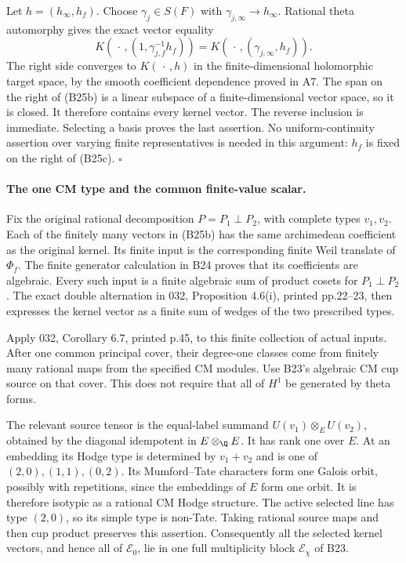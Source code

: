 Let $h=(h_\infty,h_f)$.  Choose
$\gamma_j\in S(F)$ with
$\gamma_{j,\infty}\to h_\infty$.  Rational theta
automorphy gives the exact vector equality
\[
 K(\,\cdot\,,(1,\gamma_{j,f}^{-1}h_f))
       =K(\,\cdot\,,(\gamma_{j,\infty},h_f)).
 \tag{B25c}
\]
The right side converges to $K(\,\cdot\,,h)$ in
the finite-dimensional holomorphic target space,
by the smooth coefficient dependence proved in A7.
The span on the right of (B25b) is a linear
subspace of a finite-dimensional vector space,
so it is closed.  It therefore contains every
kernel vector.  The reverse inclusion is immediate.
Selecting a basis proves the last assertion.
No uniform-continuity assertion over varying finite
representatives is needed in this argument: $h_f$
is fixed on the right of (B25c). \hfill$\square$

\paragraph{The one CM type and the common finite-value scalar.}
Fix the original rational decomposition
$P=P_1\perp P_2$, with complete types $v_1,v_2$.
Each of the finitely many vectors in (B25b) has the
same archimedean coefficient as the original kernel.
Its finite input is the corresponding finite Weil
translate of $\Phi_f$.  The finite generator
calculation in B24 proves that its coefficients
are algebraic.  Every such input is a finite
algebraic sum of product cosets for $P_1\perp P_2$.
The exact double alternation in 032,
Proposition 4.6(i), printed pp.22--23,
then expresses the kernel vector as a finite sum
of wedges of the two prescribed types.

Apply 032, Corollary 6.7, printed p.45, to this
finite collection of actual inputs.  After one
common principal cover, their degree-one classes
come from finitely many rational maps from the
specified CM modules.  Use B23's algebraic CM
cup source on that cover.  This does not require
that all of $H^1$ be generated by theta forms.

The relevant source tensor is the equal-label
summand $U(v_1)\otimes_E U(v_2)$, obtained by the
diagonal idempotent in $E\otimes_\Q E$.
It has rank one over $E$.  At an embedding its
Hodge type is determined by $v_1+v_2$ and is one
of $(2,0),(1,1),(0,2)$.  Its Mumford--Tate
characters form one Galois orbit, possibly with
repetitions, since the embeddings of $E$ form
one orbit.  It is therefore isotypic as a
rational CM Hodge structure.  The active
selected line has type $(2,0)$, so its simple
type is non-Tate.  Taking rational source maps
and then cup product preserves this assertion.
Consequently all the selected kernel vectors,
and hence all of $\mathcal E_0$, lie in one
full multiplicity block $\mathcal E_\chi$ of B23.

